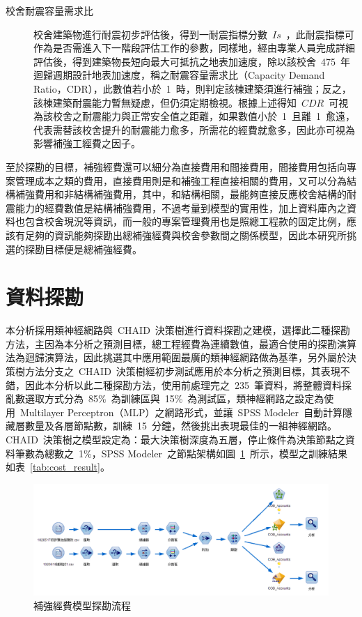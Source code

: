 \begin{description}
  \item[校舍耐震容量需求比]
  \cite{ncree09026}校舍建築物進行耐震初步評估後，得到一耐震指標分數~$Is$~，此耐震指標可作為是否需進入下一階段評估工作的參數，同樣地，經由專業人員完成詳細評估後，得到建築物長短向最大可抵抗之地表加速度，除以該校舍~475~年迴歸週期設計地表加速度，稱之耐震容量需求比（Capacity Demand Ratio，CDR），此數值若小於~1~時，則判定該棟建築須進行補強；反之，該棟建築耐震能力暫無疑慮，但仍須定期檢視。根據上述得知~$CDR$~可視為該校舍之耐震能力與正常安全值之距離，如果數值小於~1~且離~1~愈遠，代表需替該校舍提升的耐震能力愈多，所需花的經費就愈多，因此亦可視為影響補強工經費之因子。
\end{description}

至於探勘的目標，補強經費還可以細分為直接費用和間接費用，間接費用包括向專案管理成本之類的費用，直接費用則是和補強工程直接相關的費用，又可以分為結構補強費用和非結構補強費用，其中，和結構相關，最能夠直接反應校舍結構的耐震能力的經費數值是結構補強費用，不過考量到模型的實用性，加上資料庫內之資料也包含校舍現況等資訊，而一般的專案管理費用也是照總工程款的固定比例，應該有足夠的資訊能夠探勘出總補強經費與校舍參數間之關係模型，因此本研究所挑選的探勘目標便是總補強經費。

\section{資料探勘}

本分析採用類神經網路與~CHAID~決策樹進行資料探勘之建模，選擇此二種探勘方法，主因為本分析之預測目標，總工程經費為連續數值，最適合使用的探勘演算法為迴歸演算法，因此挑選其中應用範圍最廣的類神經網路做為基準，另外屬於決策樹方法分支之~CHAID~決策樹經初步測試應用於本分析之預測目標，其表現不錯，因此本分析以此二種探勘方法，使用前處理完之~235~筆資料，將整體資料採亂數選取方式分為~85\%~為訓練區與~15\%~為測試區，類神經網路之設定為使用~Multilayer Perceptron（MLP）之網路形式，並讓~SPSS Modeler~自動計算隱藏層數量及各層節點數，訓練~15~分鐘，然後挑出表現最佳的一組神經網路。CHAID~決策樹之模型設定為：最大決策樹深度為五層，停止條件為決策節點之資料筆數為總數之~1\%，SPSS Modeler~之節點架構如圖~\ref{fig:cob-flow}~所示，模型之訓練結果如表~\ref{tab:cost_result}。

\begin{figure}[hbtp]
  \begin{center}
    \includegraphics[width=1.0\textwidth]{figures/cob-flow.png}
    \caption{補強經費模型探勘流程} 
    \label{fig:cob-flow}
  \end{center}
\end{figure}


